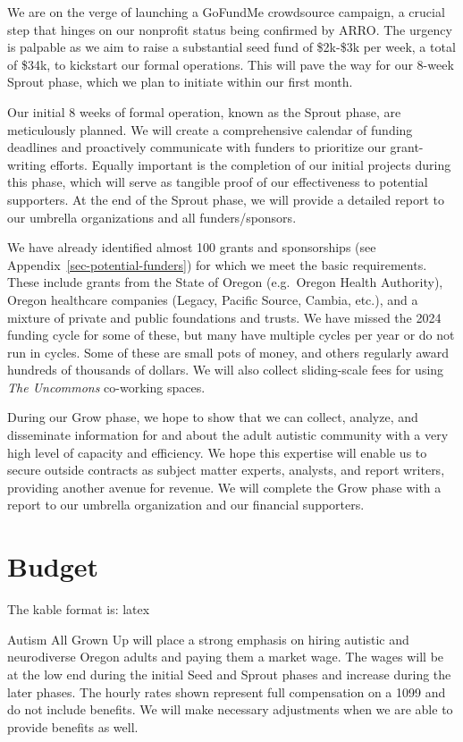 \documentclass[
  letterpaper,
  DIV=11,
  numbers=noendperiod]{scrreprt}
\begin{document}
We are on the verge of launching a GoFundMe crowdsource campaign, a
crucial step that hinges on our nonprofit status being confirmed by
ARRO. The urgency is palpable as we aim to raise a substantial seed fund
of \$2k-\$3k per week, a total of \$34k, to kickstart our formal
operations. This will pave the way for our 8-week Sprout phase, which we
plan to initiate within our first month.

Our initial 8 weeks of formal operation, known as the Sprout phase, are
meticulously planned. We will create a comprehensive calendar of funding
deadlines and proactively communicate with funders to prioritize our
grant-writing efforts. Equally important is the completion of our
initial projects during this phase, which will serve as tangible proof
of our effectiveness to potential supporters. At the end of the Sprout
phase, we will provide a detailed report to our umbrella organizations
and all funders/sponsors.

We have already identified almost 100 grants and sponsorships (see
Appendix~\ref{sec-potential-funders}) for which we meet the basic
requirements. These include grants from the State of Oregon (e.g.~Oregon
Health Authority), Oregon healthcare companies (Legacy, Pacific Source,
Cambia, etc.), and a mixture of private and public foundations and
trusts. We have missed the 2024 funding cycle for some of these, but
many have multiple cycles per year or do not run in cycles. Some of
these are small pots of money, and others regularly award hundreds of
thousands of dollars. We will also collect sliding-scale fees for using
\emph{The Uncommons} co-working spaces.

During our Grow phase, we hope to show that we can collect, analyze, and
disseminate information for and about the adult autistic community with
a very high level of capacity and efficiency. We hope this expertise
will enable us to secure outside contracts as subject matter experts,
analysts, and report writers, providing another avenue for revenue. We
will complete the Grow phase with a report to our umbrella organization
and our financial supporters.


\chapter{Budget}\label{sec-budget}

The kable format is: latex

Autism All Grown Up will place a strong emphasis on hiring autistic and
neurodiverse Oregon adults and paying them a market wage. The wages will
be at the low end during the initial Seed and Sprout phases and increase
during the later phases. The hourly rates shown represent full
compensation on a 1099 and do not include benefits. We will make
necessary adjustments when we are able to provide benefits as well.
\end{document}
